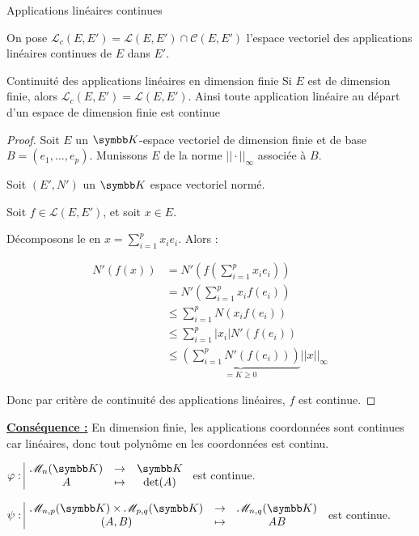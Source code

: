 \begin{definition}{Applications linéaires continues}{}

    On pose $\mathscr L_c(E, E') = \mathscr L (E, E') \cap \mathscr C(E, E')$ l'espace vectoriel 
    des applications linéaires continues de $E$ dans $E'$.
\end{definition}

\begin{theoreme}{Continuité des applications linéaires en dimension finie}{}
    Si $E$ est de dimension finie, alors $\mathscr L_c(E, E') = \mathscr L(E, E')$.
    Ainsi toute application linéaire au départ d'un espace de dimension finie est continue
\end{theoreme}

\begin{proof}
    Soit $E$ un $\K$-espace vectoriel de dimension finie et de base 
    $B = (e_1, \ldots, e_p)$. Munissons $E$ de la norme $||\cdot||_\infty$ associée à $B$.

    Soit $(E', N')$ un $\K$ espace vectoriel normé. 

    Soit $f \in \mathscr L(E, E')$, et soit $x \in E$. 

    Décomposons le en $\displaystyle x = \sum_{i=1}^p x_i e_i$. Alors : 

    \begin{align*}
        N'(f(x)) & = N'\left( f\left( \sum_{i=1}^p x_i e_i \right) \right) \\
        & = N'\left( \sum_{i=1}^p x_i f(e_i) \right) \\
        & \leqslant \sum_{i=1}^p N(x_i f(e_i)) \\
        & \leqslant \sum_{i=1}^p |x_i| N'(f(e_i)) \\
        & \leqslant \underbrace{\left( \sum_{i=1}^p N'(f(e_i)) \right)}_{ = K \geqslant 0} ||x||_\infty
    \end{align*}

    Donc par critère de continuité des applications linéaires, $f$ est continue.
\end{proof}

\textbf{\uline{Conséquence :}} 
En dimension finie, les applications coordonnées sont continues car linéaires, donc 
tout polynôme en les coordonnées est continu. 

\avspace $\fonction{\varphi}{\mathscr M_n(\K)} \K A {\det(A)}$ est continue.

$\fonction {\psi}{\mathscr M_{n, p}(\K) \times \mathscr M_{p, q}(\K)}{\mathscr M_{n, q}(\K)}{(A, B)}{AB}$ est continue.

